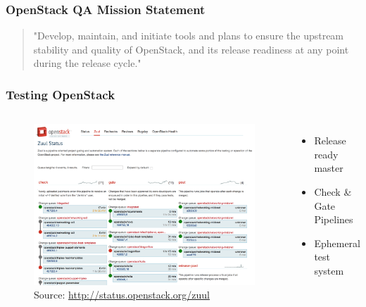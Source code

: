 \documentclass[aspectratio=169,11pt,hyperref={colorlinks=true}]{beamer}
\begin{document}

\begin{frame}
    \frametitle{OpenStack QA Mission Statement}
    \begin{center}
    	\begin{quote}{"Develop, maintain, and initiate tools and plans to ensure the upstream stability and quality of OpenStack, and its release readiness at any point during the release cycle."}
	\end{quote}
    \end{center}
\end{frame}


\begin{frame}
    \frametitle{Testing OpenStack}
       \begin{columns}
    \begin{figure}
    \begin{center}
    	\includegraphics[width=1\textwidth]{zuul_status.png}
         \caption{Source: \href{http://status.openstack.org/zuul}{http://status.openstack.org/zuul}}
    \end{center}
    \end{figure}
    \begin{itemize}
        \item{Release ready master}
        \item{Check \& Gate Pipelines}
        \item{Ephemeral test system}
    \end{itemize}
       \end{columns}
\end{frame}
\end{document}
